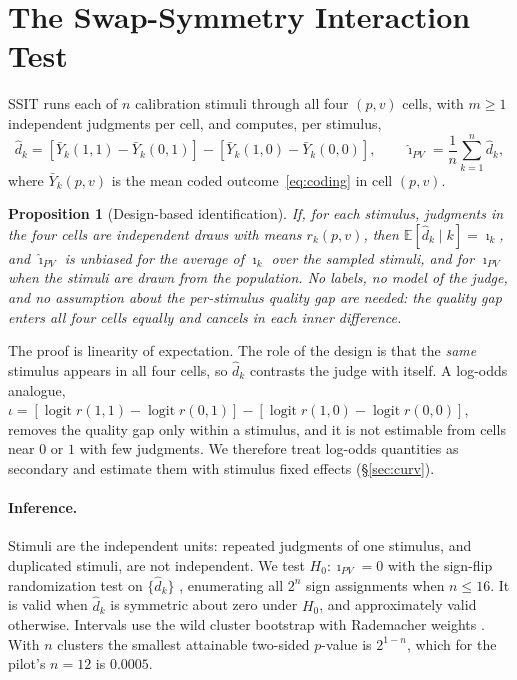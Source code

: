 \documentclass[10pt]{article}
\newtheorem{proposition}{Proposition}
\theoremstyle{remark}
\newcommand{\iPV}{\imath_{PV}}
\newcommand{\hiPV}{\hat\imath_{PV}}
\newcommand{\logit}{\operatorname{logit}}
\newcommand{\E}{\mathbb{E}}
\begin{document}
\section{The Swap-Symmetry Interaction Test}
\label{sec:ssit}

SSIT runs each of $n$ calibration stimuli through all four $(p,v)$ cells,
with $m\geq1$ independent judgments per cell, and computes, per stimulus,
\begin{equation}
  \hat d_k=[\bar Y_k(1,1)-\bar Y_k(0,1)]-[\bar Y_k(1,0)-\bar Y_k(0,0)],
  \qquad \hiPV=\frac1n\sum_{k=1}^n \hat d_k ,
  \label{eq:ssit}
\end{equation}
where $\bar Y_k(p,v)$ is the mean coded outcome~\eqref{eq:coding} in cell
$(p,v)$.

\begin{proposition}[Design-based identification]
\label{prop:ssit}
If, for each stimulus, judgments in the four cells are independent draws
with means $r_k(p,v)$, then $\E[\hat d_k\mid k]=\imath_k$, and
$\hiPV$ is unbiased for the average of $\imath_k$ over the sampled
stimuli, and for $\iPV$ when the stimuli are drawn from the population.
No labels, no model of the judge, and no assumption about the per-stimulus
quality gap are needed: the quality gap enters all four cells equally and
cancels in each inner difference.
\end{proposition}

\noindent The proof is linearity of expectation. The role of the design
is that the \emph{same} stimulus appears in all four cells, so
$\hat d_k$ contrasts the judge with itself. A log-odds analogue,
$\iota=[\logit r(1,1)-\logit r(0,1)]-[\logit r(1,0)-\logit r(0,0)]$,
removes the quality gap only within a stimulus, and it is not
estimable from cells near $0$ or $1$ with few judgments. We therefore
treat log-odds quantities as secondary and estimate them with stimulus
fixed effects (\S\ref{sec:curv}).

\paragraph{Inference.}
Stimuli are the independent units: repeated judgments of one stimulus,
and duplicated stimuli, are not independent. We test $H_0:\iPV=0$ with
the sign-flip randomization test on $\{\hat d_k\}$
\citep{fisher1935design}, enumerating all $2^n$ sign assignments when
$n\leq16$. It is valid when $\hat d_k$ is symmetric about zero under
$H_0$, and approximately valid otherwise. Intervals use the wild
cluster bootstrap with Rademacher weights \citep{cameron2008bootstrap}.
With $n$ clusters the smallest attainable two-sided $p$-value is
$2^{1-n}$, which for the pilot's $n=12$ is $0.0005$.
\end{document}
